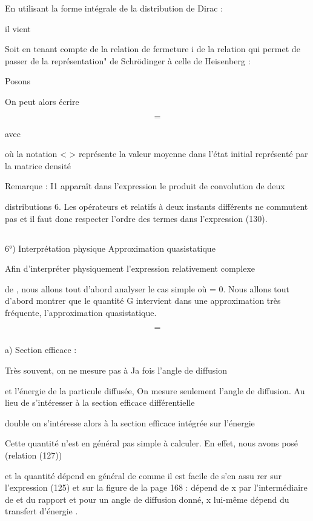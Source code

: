 En utilisant la forme intégrale de la distribution de Dirac :

il vient

Soit en tenant compte de la relation de fermeture i de la
relation qui permet de passer de la représentation" de Schrödinger à celle de
Heisenberg :

Posons

On peut alors écrire

\[
\tag{129}=
\]

avec

où la notation < > représente la valeur moyenne dans l'état initial représenté
par la matrice densité

Remarque : I1 apparaît dans l'expression  le produit de convolution de deux

distributions 6. Les opérateurs  et  relatifs à deux instants différents
ne commutent pas et il faut donc respecter l'ordre des termes dans l'expression (130).

\subsection{}%
6°) Interprétation physique Approximation quasistatique

 

Afin d'interpréter physiquement l'expression relativement complexe

de , nous allons tout d'abord analyser le cas simple où  = 0. Nous allons
tout d'abord montrer que le quantité G  intervient dans une approximation
très fréquente, l'approximation quasistatique.

\[
\tag{131}=
\]

\subsubsection{}%
a) Section efficace :

Très souvent, on ne mesure pas à Ja fois l'angle de diffusion

et l'énergie de la particule diffusée, On mesure seulement l'angle de diffusion.
Au lieu de s'intéresser à la section efficace différentielle

double  on s'intéresse alors à la section efficace intégrée sur
l'énergie

Cette quantité n'est en général pas simple à calculer. En effet, nous avons
posé (relation (127))

et la quantité dépend en général de  comme il est facile de s'en assu
rer sur l'expression (125) et sur la figure de la page 168 :  dépend de x
par l'intermédiaire de  et du rapport  et pour un angle de diffusion
 donné, x lui-même dépend du transfert d'énergie .

